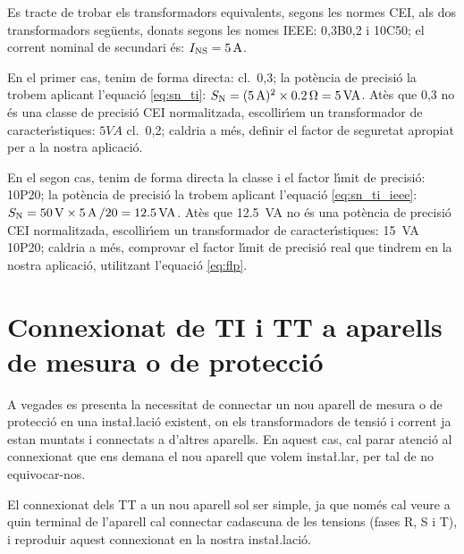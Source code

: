 \begin{exemple}
    Es tracte de trobar els transformadors equivalents, segons les normes \textsf{CEI}, als dos
    transformadors seg\"{u}ents, donats segons les nomes \textsf{IEEE}: 0,3B0,2 i
    10C50; el corrent nominal de secundari \'{e}s:    $I_\mathrm{NS}=5\mathrm{\,A}$.

    En el primer cas, tenim de forma directa: cl.~0,3; la pot\`{e}ncia de precisi\'{o} la trobem
    aplicant l'equaci\'{o} \eqref{eq:sn_ti}: $S_\mathrm{N} =(\SI{5}{A})^2 \times \SI{0,2}{\ensuremath{\mathrm{\Omega}}} =
    \SI{5}{VA}$.
    At\`{e}s que 0,3 no \'{e}s una classe de precisi\'{o} \textsf{CEI} normalitzada,
    escollir\'{\i}em un transformador de caracter\'{\i}stiques:
    $5\unit{VA}$ cl.~0,2; caldria a m\'{e}s, definir el factor de
    seguretat apropiat per a la nostra aplicaci\'{o}.

    En el segon cas, tenim de forma directa la classe i el factor l\'{\i}mit de
    precisi\'{o}: 10P20; la pot\`{e}ncia de precisi\'{o} la trobem
    aplicant l'equaci\'{o} \eqref{eq:sn_ti_ieee}: $S_\mathrm{N} = \SI{50}{V} \times
    \SI{5}{A}\, / 20 = \SI{12,5}{VA}$.
    At\`{e}s que \SI{12,5}{VA} no \'{e}s una pot\`{e}ncia de precisi\'{o} \textsf{CEI} normalitzada,
     escollir\'{\i}em un transformador de caracter\'{\i}stiques:
    \SI{15}{VA} 10P20; caldria a m\'{e}s, comprovar el factor l\'{\i}mit de precisi\'{o} real
    que tindrem en la nostra aplicaci\'{o}, utilitzant l'equaci\'{o} \eqref{eq:flp}.

\end{exemple}

\section{Connexionat de TI i TT a aparells de mesura o de
protecci\'{o}}\label{sec:conex_ti_tt}

A vegades es presenta la necessitat de connectar un nou aparell de
mesura o de protecci\'{o} en una insta{\l.l}aci\'{o} existent, on els
transformadors de tensi\'{o} i corrent ja estan muntats i connectats a
d'altres aparells. En aquest cas, cal parar atenci\'{o} al connexionat
que ens demana el nou aparell que volem insta{\l.l}ar, per tal de no
equivocar-nos.

El connexionat dels TT a un nou aparell sol ser simple, ja que nom\'{e}s
cal veure a quin terminal de l'aparell cal connectar cadascuna de
les tensions (fases R, S i T), i reproduir aquest connexionat en la
nostra insta{\l.l}aci\'{o}.

